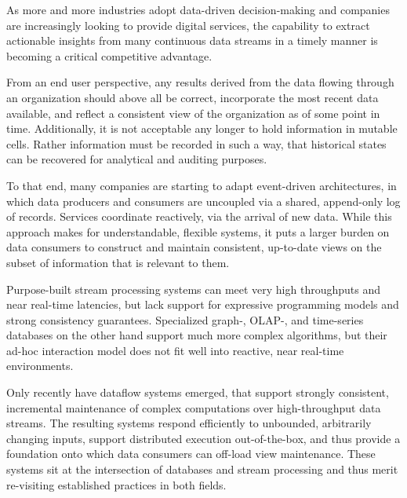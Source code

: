 \documentclass[../index.tex]{subfiles}
\begin{document}
As more and more industries adopt data-driven decision-making and
companies are increasingly looking to provide digital services, the
capability to extract actionable insights from many continuous data
streams in a timely manner is becoming a critical competitive
advantage.

From an end user perspective, any results derived from the data
flowing through an organization should above all be correct,
incorporate the most recent data available, and reflect a consistent
view of the organization as of some point in time. Additionally, it is
not acceptable any longer to hold information in mutable cells. Rather
information must be recorded in such a way, that historical states can
be recovered for analytical and auditing purposes.

To that end, many companies are starting to adapt event-driven
architectures, in which data producers and consumers are uncoupled via
a shared, append-only log of records. Services coordinate reactively,
via the arrival of new data. While this approach makes for
understandable, flexible systems, it puts a larger burden on data
consumers to construct and maintain consistent, up-to-date views on
the subset of information that is relevant to them.

Purpose-built stream processing systems can meet very high throughputs
and near real-time latencies, but lack support for expressive
programming models and strong consistency guarantees. Specialized
graph-, OLAP-, and time-series databases on the other hand support
much more complex algorithms, but their ad-hoc interaction model does
not fit well into reactive, near real-time environments.

Only recently have dataflow systems emerged, that support strongly
consistent, incremental maintenance of complex computations over
high-throughput data streams. The resulting systems respond
efficiently to unbounded, arbitrarily changing inputs, support
distributed execution out-of-the-box, and thus provide a foundation
onto which data consumers can off-load view maintenance. These systems
sit at the intersection of databases and stream processing and thus
merit re-visiting established practices in both fields.
\end{document}
